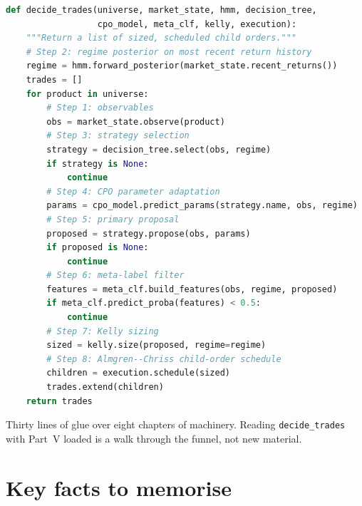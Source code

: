 \begin{lstlisting}[language=Python, caption={Pipeline composition.
Each dependency object implements the interface of its chapter.
See \cref{sec:wsw_pipeline} for the eight-step breakdown.}]
def decide_trades(universe, market_state, hmm, decision_tree,
                  cpo_model, meta_clf, kelly, execution):
    """Return a list of sized, scheduled child orders."""
    # Step 2: regime posterior on most recent return history
    regime = hmm.forward_posterior(market_state.recent_returns())
    trades = []
    for product in universe:
        # Step 1: observables
        obs = market_state.observe(product)
        # Step 3: strategy selection
        strategy = decision_tree.select(obs, regime)
        if strategy is None:
            continue
        # Step 4: CPO parameter adaptation
        params = cpo_model.predict_params(strategy.name, obs, regime)
        # Step 5: primary proposal
        proposed = strategy.propose(obs, params)
        if proposed is None:
            continue
        # Step 6: meta-label filter
        features = meta_clf.build_features(obs, regime, proposed)
        if meta_clf.predict_proba(features) < 0.5:
            continue
        # Step 7: Kelly sizing
        sized = kelly.size(proposed, regime=regime)
        # Step 8: Almgren--Chriss child-order schedule
        children = execution.schedule(sized)
        trades.extend(children)
    return trades
\end{lstlisting}

Thirty lines of glue over eight chapters of machinery. Reading
\texttt{decide\_trades} with Part~V loaded is a walk through the
funnel, not new material.

\section{Key facts to memorise}
\label{sec:wsw_keyfacts}

